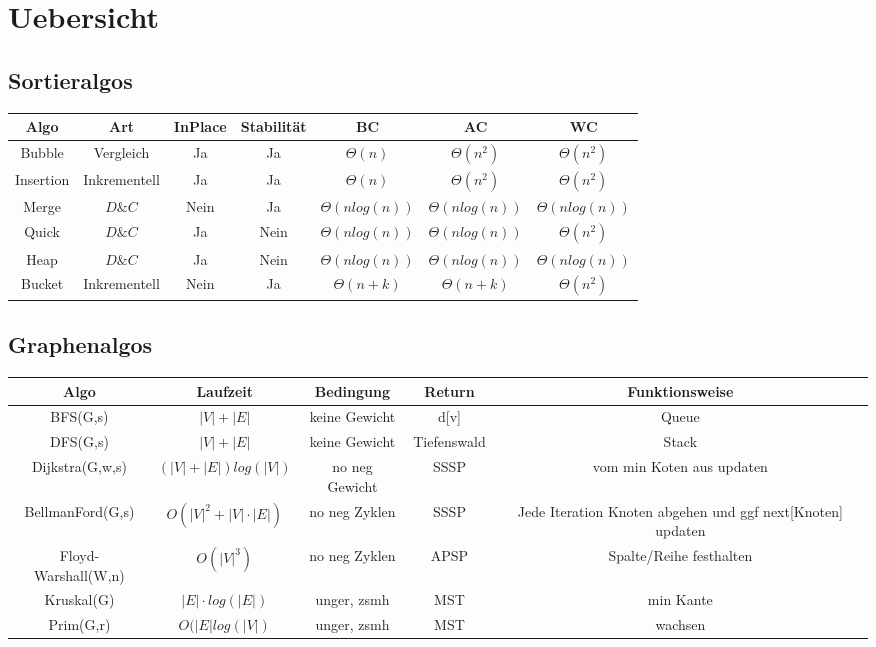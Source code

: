 \documentclass{article}
\begin{document}
\section{Uebersicht}
\subsection{Sortieralgos}
\begin{tabular}{c | c| c| c| c |c| c }
Algo & Art & InPlace & Stabilit{\"a}t & BC & AC & WC \\ \hline
Bubble& Vergleich& Ja & Ja & $\Theta(n)$ & $\Theta(n^2)$ & $\Theta(n^2)$\\
Insertion& Inkrementell & Ja & Ja & $\Theta(n)$ & $\Theta(n^2)$ & $\Theta(n^2)$ \\
Merge& $D\&C $ & Nein & Ja & $\Theta(nlog(n))$ & $\Theta(nlog(n))$ & $\Theta(nlog(n))$ \\
Quick& $D\&C $ & Ja & Nein & $\Theta(nlog(n))$ & $\Theta(nlog(n))$ & $\Theta(n^2)$ \\
Heap& $D\&C $ & Ja & Nein & $\Theta(nlog(n))$ & $\Theta(nlog(n))$ & $\Theta(nlog(n))$ \\
Bucket& Inkrementell & Nein & Ja & $\Theta(n+k)$ & $\Theta(n+k)$ & $\Theta(n^2)$ \\

\end{tabular}

\subsection{Graphenalgos}

\begin{tabular}{c|c|c|c|c}

Algo & Laufzeit & Bedingung & Return & Funktionsweise \\ \hline
BFS(G,s) &$|V|+|E|$ & keine Gewicht& d[v] & Queue\\
DFS(G,s)& $|V|+|E|$ & keine Gewicht & Tiefenswald& Stack \\
Dijkstra(G,w,s)& $(|V|+|E|)log(|V|)$ & no neg Gewicht& SSSP& vom min Koten aus updaten \\
BellmanFord(G,s)& $O(|V|^2+|V|\cdot|E|)$ &no neg Zyklen &SSSP & Jede Iteration Knoten abgehen und ggf next[Knoten] updaten\\ 
Floyd-Warshall(W,n)& $O(|V|^3)$ &no neg Zyklen& APSP & Spalte/Reihe festhalten \\ 
Kruskal(G)& $|E|\cdot log(|E|)$ & unger, zsmh& MST& min Kante \\ 
Prim(G,r)& $O(|E| log(|V|)$ & unger, zsmh & MST& wachsen\\ 

\end{tabular}
\end{document}
